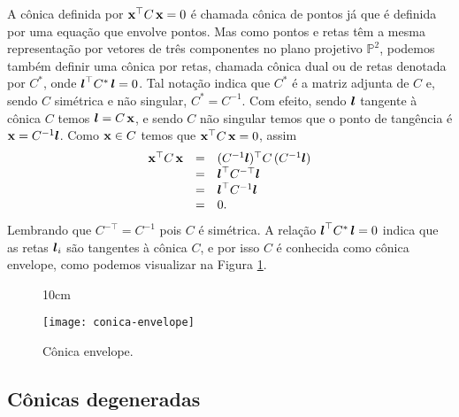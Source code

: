 A cônica definida por $\mathbf{x}^\top C\,\mathbf{x}=0$ é chamada cônica de pontos já que é definida por uma equação que envolve pontos. Mas como pontos e retas têm a mesma representação por vetores de três componentes no plano projetivo $\mathbb{P}^2$, podemos também definir uma cônica por retas, chamada cônica dual ou de retas denotada por $C^*$, onde $\boldsymbol{l}^\top C^*\,\boldsymbol{l}=0$. Tal notação indica que $C^*$ é a matriz adjunta de $C$ e, sendo $C$ simétrica e não singular, $C^*=C^{-1}$. Com efeito, sendo $\boldsymbol{l}$ tangente à cônica $C$ temos $\boldsymbol{l}=C\,\mathbf{x}$, e sendo $C$ não singular temos que o ponto de tangência é $\mathbf{x}=C^{-1}\boldsymbol{l}$. Como $\mathbf{x}\in C$ temos que $\mathbf{x}^\top C\,\mathbf{x}=0$, assim
\begin{equation*}
\begin{array}{rcl}
\mathbf{x}^\top C\,\mathbf{x}&=&(C^{-1}\boldsymbol{l})^\top C\,(
C^{-1}\boldsymbol{l})\\
&=&\boldsymbol{l}^\top C^{-\top}\boldsymbol{l}\\
&=&\boldsymbol{l}^\top C^{-1}\boldsymbol{l}\\
&=&0.
\end{array}
\end{equation*}
Lembrando que $C^{-\top}=C^{-1}$ pois $C$ é simétrica. A relação $\boldsymbol{l}^\top C^*\,\boldsymbol{l}=0$ indica que as retas $\boldsymbol{l}_i$ são tangentes à cônica $C$, e por isso $C$ é conhecida como cônica envelope, como podemos visualizar na Figura \ref{fig.conica-envelope}.
\begin{figure}[!htb]{10cm}
\caption{C\^onica envelope.}
\texttt{[image: conica-envelope]}
\label{fig.conica-envelope}
\end{figure}
\subsection{Cônicas degeneradas}\label{sec.conicas-degeneradas}

